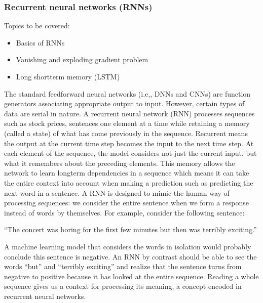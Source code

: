\documentclass[letterpaper,10pt,english]{jupyterBook}
\begin{document}
\subsubsection{Recurrent neural networks (RNNs)}
\label{\detokenize{Modelling/Neural_networks:recurrent-neural-networks-rnns}}
\sphinxAtStartPar
Topics to be covered:
\begin{itemize}
\item {} 
\sphinxAtStartPar
Basics of RNNs

\item {} 
\sphinxAtStartPar
Vanishing and exploding gradient problem

\item {} 
\sphinxAtStartPar
Long short\sphinxhyphen{}term memory (LSTM)

\end{itemize}

\sphinxAtStartPar
{}

\sphinxAtStartPar
The standard feedforward neural networks (i.e,, DNNs and CNNs) are
function generators associating appropriate output to input. However,
certain types of data are serial in nature. A recurrent neural network
(RNN) processes sequences such as stock prices, sentences one element at
a time while retaining a memory (called a state) of what has come
previously in the sequence. Recurrent means the output at the current
time step becomes the input to the next time step. At each element of
the sequence, the model considers not just the current input, but what
it remembers about the preceding elements. This memory allows the
network to learn long\sphinxhyphen{}term dependencies in a sequence which means it can
take the entire context into account when making a prediction such as
predicting the next word in a sentence. A RNN is designed to mimic the
human way of processing sequences: we consider the entire sentence when
we form a response instead of words by themselves. For example, consider
the following sentence:

\sphinxAtStartPar
“The concert was boring for the first few minutes but then was terribly
exciting.”

\sphinxAtStartPar
A machine learning model that considers the words in isolation would
probably conclude this sentence is negative. An RNN by contrast should
be able to see the words “but” and “terribly exciting” and realize that
the sentence turns from negative to positive because it has looked at
the entire sequence. Reading a whole sequence gives us a context for
processing its meaning, a concept encoded in recurrent neural networks.
\end{document}
